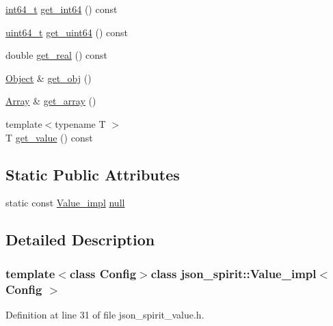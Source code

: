 \begin{DoxyCompactItemize}
\hyperlink{stdint_8h_adec1df1b8b51cb32b77e5b86fff46471}{int64\+\_\+t} \hyperlink{classjson__spirit_1_1_value__impl_a7cff422be4cac53ae6028cb9ace9938b}{get\+\_\+int64} () const 
\item 
\hyperlink{stdint_8h_aaa5d1cd013383c889537491c3cfd9aad}{uint64\+\_\+t} \hyperlink{classjson__spirit_1_1_value__impl_a91abab5e2652f09c47bb0b5492dd3207}{get\+\_\+uint64} () const 
\item 
double \hyperlink{classjson__spirit_1_1_value__impl_af696a5b60d54b4dc0214ff11220d6bb0}{get\+\_\+real} () const 
\item 
\hyperlink{classjson__spirit_1_1_value__impl_ac4467b91c71f897bab0c6d74864ae991}{Object} \& \hyperlink{classjson__spirit_1_1_value__impl_abd603895abad0753475601f5053e436f}{get\+\_\+obj} ()
\item 
\hyperlink{classjson__spirit_1_1_value__impl_a8cbad4704c204a3421817f08a0b44dd6}{Array} \& \hyperlink{classjson__spirit_1_1_value__impl_a77e326681a2ee973b8f46a1429494001}{get\+\_\+array} ()
\item 
{\footnotesize template$<$typename T $>$ }\\T \hyperlink{classjson__spirit_1_1_value__impl_a56eccdc3d3de23ccab93780a7c19df32}{get\+\_\+value} () const 
\end{DoxyCompactItemize}
\subsection*{Static Public Attributes}
\begin{DoxyCompactItemize}
\item 
static const \hyperlink{classjson__spirit_1_1_value__impl}{Value\+\_\+impl} \hyperlink{classjson__spirit_1_1_value__impl_abb8ef4f2732e2c842afa716c456cb35d}{null}
\end{DoxyCompactItemize}


\subsection{Detailed Description}
\subsubsection*{template$<$class Config$>$class json\+\_\+spirit\+::\+Value\+\_\+impl$<$ Config $>$}



Definition at line 31 of file json\+\_\+spirit\+\_\+value.\+h.




